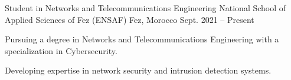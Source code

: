 
\begin{cventries}

    \cventry
    {Student in Networks and Telecommunications Engineering} %
    {National School of Applied Sciences of Fez (ENSAF)} %
    {Fez, Morocco} %
    {Sept. 2021 – Present} %
    {
        \begin{cvitems} %
            \item {Pursuing a degree in Networks and Telecommunications Engineering with a specialization in Cybersecurity.}
            \item {Developing expertise in network security and intrusion detection systems.}
        \end{cvitems}
    }
\end{cventries}
